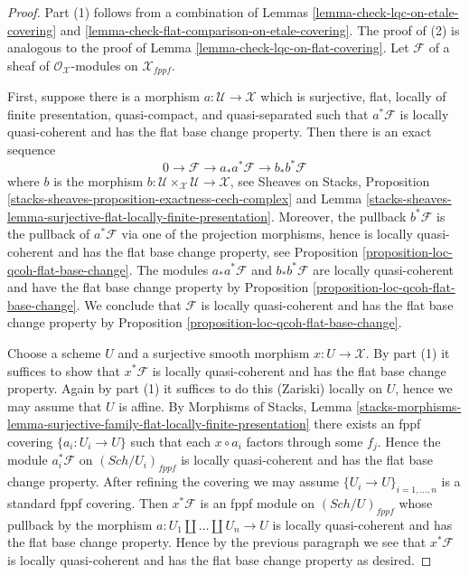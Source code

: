 \documentclass{stacks-project}
\theoremstyle{plain}
\theoremstyle{definition}
\theoremstyle{remark}
\numberwithin{equation}{subsection}
\def\Sch{\mathit{Sch}}
\begin{document}
\begin{proof}
Part (1) follows from a combination of
Lemmas \ref{lemma-check-lqc-on-etale-covering} and
\ref{lemma-check-flat-comparison-on-etale-covering}.
The proof of (2) is analogous to the proof of
Lemma \ref{lemma-check-lqc-on-flat-covering}.
Let $\mathcal{F}$ of a sheaf of $\mathcal{O}_\mathcal{X}$-modules
on $\mathcal{X}_{fppf}$.

\medskip\noindent
First, suppose there is a morphism $a : \mathcal{U} \to \mathcal{X}$
which is surjective, flat, locally of finite presentation, quasi-compact,
and quasi-separated such that $a^*\mathcal{F}$ is locally quasi-coherent
and has the flat base change property.
Then there is an exact sequence
$$
0 \to \mathcal{F} \to a_*a^*\mathcal{F} \to b_*b^*\mathcal{F}
$$
where $b$ is the morphism
$b : \mathcal{U} \times_\mathcal{X} \mathcal{U} \to \mathcal{X}$, see
Sheaves on Stacks, Proposition
\ref{stacks-sheaves-proposition-exactness-cech-complex} and
Lemma \ref{stacks-sheaves-lemma-surjective-flat-locally-finite-presentation}.
Moreover, the pullback $b^*\mathcal{F}$ is the pullback of $a^*\mathcal{F}$
via one of the projection morphisms, hence is locally quasi-coherent
and has the flat base change property, see
Proposition \ref{proposition-loc-qcoh-flat-base-change}.
The modules $a_*a^*\mathcal{F}$ and $b_*b^*\mathcal{F}$ are locally
quasi-coherent and have the flat base change property by
Proposition \ref{proposition-loc-qcoh-flat-base-change}.
We conclude that $\mathcal{F}$ is locally quasi-coherent and
has the flat base change property by
Proposition \ref{proposition-loc-qcoh-flat-base-change}.

\medskip\noindent
Choose a scheme $U$ and a surjective smooth morphism $x : U \to \mathcal{X}$.
By part (1) it suffices to show that $x^*\mathcal{F}$ is locally
quasi-coherent and has the flat base change property.
Again by part (1) it suffices to do this (Zariski) locally on $U$,
hence we may assume that $U$ is affine. By
Morphisms of Stacks, Lemma
\ref{stacks-morphisms-lemma-surjective-family-flat-locally-finite-presentation}
there exists an fppf covering $\{a_i : U_i \to U\}$ such that
each $x \circ a_i$ factors through some $f_j$. Hence the module
$a_i^*\mathcal{F}$ on $(\Sch/U_i)_{fppf}$
is locally quasi-coherent and has the flat base change property.
After refining the covering we may assume $\{U_i \to U\}_{i = 1, \ldots, n}$
is a standard fppf covering. Then $x^*\mathcal{F}$ is an fppf
module on $(\Sch/U)_{fppf}$ whose pullback by the morphism
$a : U_1 \amalg \ldots \amalg U_n \to U$ is locally quasi-coherent
and has the flat base change property.
Hence by the previous paragraph we see that $x^*\mathcal{F}$ is locally
quasi-coherent and has the flat base change property as desired.
\end{proof}
\end{document}
